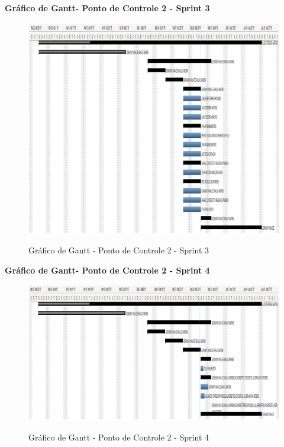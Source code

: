     \pagebreak
  \textbf{Gráfico de Gantt- Ponto de Controle 2 - Sprint 3}
   \begin{figure}[!h]
    \centering
    \includegraphics[scale = 1]{editaveis/figuras/ganttPC2S3}
    \label{Gráfico de Gantt PC2S3}
    \caption{Gráfico de Gantt - Ponto de Controle 2 - Sprint 3}
   \end{figure}
   \FloatBarrier
   
   \pagebreak
  \textbf{Gráfico de Gantt- Ponto de Controle 2 - Sprint 4}
   \begin{figure}[!h]
    \centering
    \includegraphics[scale = 1]{editaveis/figuras/ganttPC2S4}
    \label{Gráfico de Gantt PC2S4}
    \caption{Gráfico de Gantt - Ponto de Controle 2 - Sprint 4}
   \end{figure}
   \FloatBarrier
   

